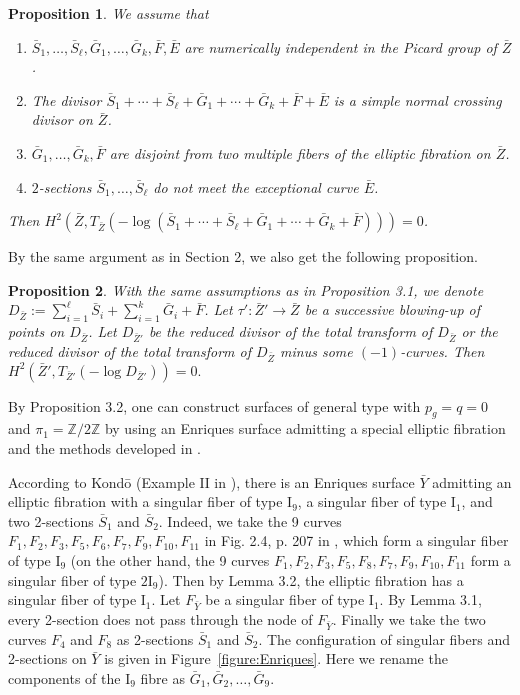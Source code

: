 \documentclass[twoside,11pt]{amsart}
\newtheorem{proposition}{Proposition}[section]
\begin{document}
\begin{proposition}
\label{prop 3.1}We assume that
\begin{enumerate}
\item $\bar S_1,\ldots, \bar S_\ell, \bar G_1, \ldots, \bar G_k, \bar F, \bar E$
are numerically independent in the Picard group of $\bar Z$.
\item The divisor
$\bar S_1+\cdots+\bar S_\ell+\bar G_1+\cdots+\bar G_k+\bar F+\bar
E$ is a simple normal crossing divisor on $\bar Z$.
\item $\bar G_1, \ldots, \bar G_k, \bar F$ are disjoint from two multiple fibers of the
elliptic fibration on $\bar Z$.
\item $2$-sections $\bar S_1,\ldots, \bar S_\ell$ do not meet the exceptional curve $\bar
E$.
\end{enumerate}
Then $H^2(\bar Z, T_{\bar Z}(-{\operatorname{log}}(\bar S_1+\cdots + \bar
S_\ell+\bar G_1+\cdots+\bar G_k+\bar F)))=0$.
\end{proposition}

By the same argument as in Section 2, we also get the following
proposition.

\begin{proposition}
\label{prop 3.2} With the same assumptions as in Proposition 3.1,
we denote $D_{\bar Z}:=\sum_{i=1}^\ell \bar S_i +\sum_{i=1}^k \bar
G_i+\bar F$. Let $\tau': \bar Z'\to \bar Z$ be a successive
blowing-up of points on $D_{\bar Z}$. Let $D_{\bar Z'}$ be the
reduced divisor of the total transform of $D_{\bar Z}$ or the
reduced divisor of the total transform of  $D_{\bar Z}$ minus some
$(-1)$-curves. Then $H^2(\bar Z', T_{\bar Z'}(-{\operatorname{log}} D_{\bar
Z'}))=0.$
\end{proposition}

By Proposition 3.2, one can construct surfaces of general type
with $p_g=q=0$ and $\pi_1={{\mathbb Z}}/2{{\mathbb Z}}$ by using an Enriques surface
admitting a special elliptic fibration and the methods developed
in \cite{LP1}.

{\medskip} According to Kond\=o (Example $\mathrm{II}$ in \cite{Kon}),
there is an Enriques surface $\bar Y$ admitting an elliptic
fibration with a singular fiber of type $\mathrm{I_9}$, a singular
fiber of type $\mathrm{I_1}$, and two 2-sections $\bar S_1$ and
$\bar S_2$. Indeed, we take the 9 curves
 $F_1, F_2, F_3, F_5, F_6, F_7, F_9, F_{10}, F_{11}$
in Fig. 2.4, p. 207 in \cite{Kon}, which form a singular fiber of
type $\mathrm{I_9}$ (on the other hand, the 9 curves
 $F_1, F_2, F_3, F_5, F_8, F_7, F_9, F_{10}, F_{11}$ form a singular fiber of type $2\mathrm{I_9}$). Then by Lemma 3.2,
the elliptic fibration has a singular fiber of type
$\mathrm{I_1}$. Let $F_{\bar Y}$ be a singular fiber of type
$\mathrm{I_1}$. By Lemma 3.1, every 2-section does not pass
through the node of $F_{\bar Y}$. Finally we take the two curves
$F_4$ and $F_8$ as 2-sections $\bar S_1$ and $\bar S_2$. The
configuration of singular fibers and 2-sections on $\bar Y$ is
given in Figure~\ref{figure:Enriques}. Here we rename the components of the
$\mathrm{I_9}$ fibre as $\bar G_1, \bar G_2, \ldots, \bar G_9$.
\end{document}
